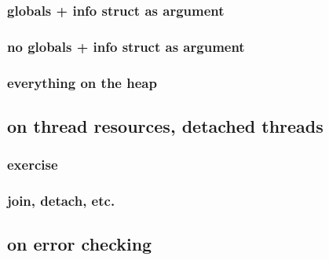 \subsubsection{globals + info struct as argument}



\subsubsection{no globals + info struct as argument}



\subsubsection{everything on the heap}



\subsection{on thread resources, detached threads}

\subsubsection{exercise}


\subsubsection{join, detach, etc.}


\subsection{on error checking}




